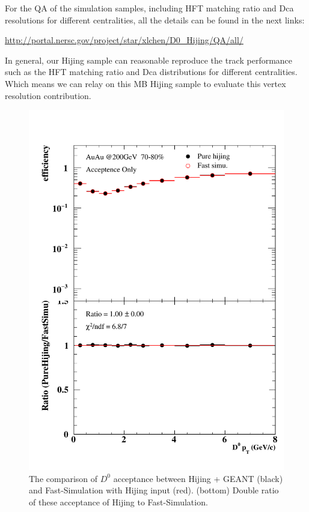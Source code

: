 For the QA of the simulation samples, including HFT matching ratio and Dca resolutions for different centralities, all the details can be found in the next links:

\url{http://portal.nersc.gov/project/star/xlchen/D0_Hijing/QA/all/}

In general, our Hijing sample can reasonable reproduce the track performance such as the HFT matching ratio and Dca distributions for different centralities. Which means we can relay on this MB Hijing sample to evaluate this vertex resolution contribution.

\begin{figure}[htbp]
\begin{minipage}[htbp]{0.47\linewidth}
\centering
\includegraphics[width=1.0\textwidth,angle=0]{figure/Run14_D0HFT/70_80_0_0.pdf}
\caption{ The comparison of $D^0$ acceptance between Hijing + GEANT (black) and Fast-Simulation with Hijing input (red). (bottom) Double ratio of these acceptance of Hijing to Fast-Simulation.\label{70_80_0}}

\end{minipage}
\end{figure}
